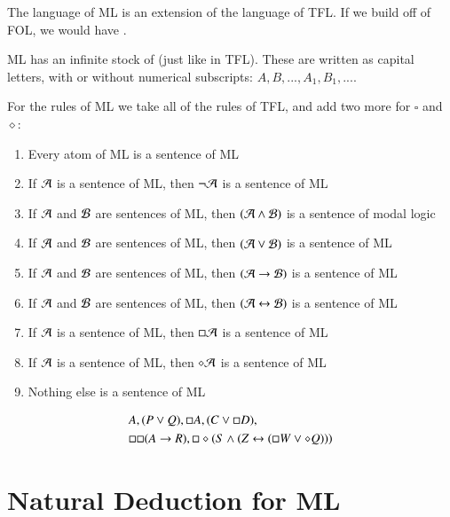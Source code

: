 \documentclass[12pt, a4paper, oneside, openright, titlepage]{book}
\begin{document}
The language of ML is an extension of the language of TFL. If we build off of FOL, we would have . 

\begin{defn}
    ML has an infinite stock of  (just like in TFL). These are written as capital letters, with or without numerical subscripts: $A,B,...,A_1,B_1,...$.
\end{defn}

\begin{defn}
    For the rules of ML we take all of the rules of TFL, and add two more for $\square$ and $\diamond$: \begin{enumerate}
        \item Every atom of ML is a sentence of ML
        \item If $\mathcal{A}$ is a sentence of ML, then $\neg \mathcal{A}$ is a sentence of ML
        \item If $\mathcal{A}$ and $\mathcal{B}$ are sentences of ML, then $(\mathcal{A}\wedge \mathcal{B})$ is a sentence of modal logic
        \item If $\mathcal{A}$ and $\mathcal{B}$ are sentences of ML, then $(\mathcal{A}\vee \mathcal{B})$ is a sentence of ML
        \item If $\mathcal{A}$ and $\mathcal{B}$ are sentences of ML, then $(\mathcal{A}\rightarrow \mathcal{B})$ is a sentence of ML
        \item If $\mathcal{A}$ and $\mathcal{B}$ are sentences of ML, then $(\mathcal{A}\leftrightarrow \mathcal{B})$ is a sentence of ML
        \item If $\mathcal{A}$ is a sentence of ML, then $\square\mathcal{A}$ is a sentence of ML
        \item If $\mathcal{A}$ is a sentence of ML, then $\diamond\mathcal{A}$ is a sentence of ML
        \item Nothing else is a sentence of ML
    \end{enumerate}
\end{defn}

\begin{eg}
    \begin{align*}
        &A, (P\vee Q), \square A, (C\vee \square D),\\
        &\square\square(A\rightarrow R), \square\diamond(S\wedge(Z\leftrightarrow (\square W\vee \diamond Q)))
    \end{align*}
\end{eg}


\section{\textsection Natural Deduction for ML}
\end{document}
